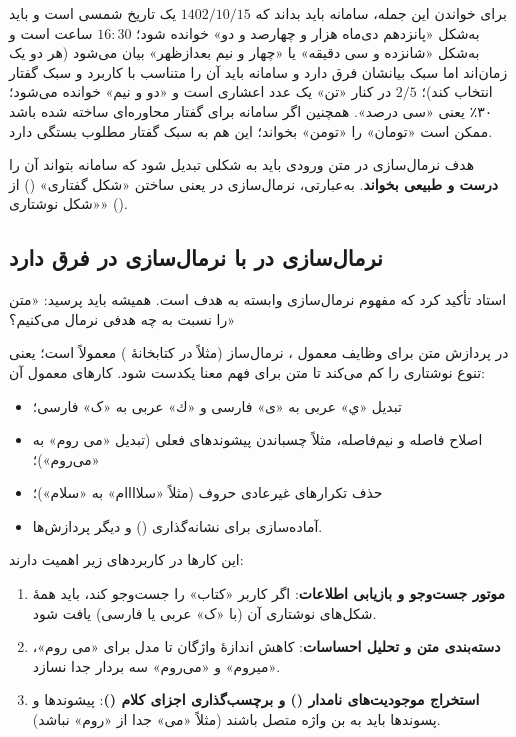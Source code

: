 برای خواندن این جمله، سامانه باید بداند که $1402/10/15$ یک تاریخ شمسی است و باید به‌شکل «پانزدهم دی‌ماه هزار و چهارصد و دو» خوانده شود؛ $16{:}30$ ساعت است و به‌شکل «شانزده و سی دقیقه» یا «چهار و نیم بعدازظهر» بیان می‌شود (هر دو یک زمان‌اند اما سبک بیانشان فرق دارد و سامانه باید آن را متناسب با کاربرد و سبک گفتار انتخاب کند)؛ $2/5$ در کنار «تن» یک عدد اعشاری است و «دو و نیم» خوانده می‌شود؛ ۳۰٪ یعنی «سی درصد». همچنین اگر سامانه برای گفتار محاوره‌ای ساخته شده باشد ممکن است «تومان» را «تومن» بخواند؛ این هم به سبک گفتار مطلوب بستگی دارد.

\begin{definitionbox}{هدف نرمال‌سازی در }
متن ورودی باید به شکلی تبدیل شود که سامانه بتواند آن را \textbf{درست و طبیعی بخواند}. به‌عبارتی، نرمال‌سازی در  یعنی ساختن «شکل گفتاری» () از «شکل نوشتاری» ().
\end{definitionbox}

\subsection{نرمال‌سازی در  با نرمال‌سازی در  فرق دارد}
استاد تأکید کرد که مفهوم نرمال‌سازی وابسته به هدف است. همیشه باید پرسید: «متن را نسبت به چه هدفی نرمال می‌کنیم؟»

در پردازش متن برای وظایف معمول ، نرمال‌ساز (مثلاً در کتابخانهٔ ) معمولاً  است؛ یعنی تنوع نوشتاری را کم می‌کند تا متن برای فهم معنا یکدست شود. کارهای معمول آن:
\begin{itemize}
  \item تبدیل «ي» عربی به «ی» فارسی و «ك» عربی به «ک» فارسی؛
  \item اصلاح فاصله و نیم‌فاصله، مثلاً چسباندن پیشوندهای فعلی (تبدیل «می روم» به «می‌روم»)؛
  \item حذف تکرارهای غیرعادی حروف (مثلاً «سلاااام» به «سلام»)؛
  \item آماده‌سازی برای نشانه‌گذاری () و دیگر پردازش‌ها.
\end{itemize}
این کارها در کاربردهای زیر اهمیت دارند:
\begin{enumerate}
  \item \textbf{موتور جست‌وجو و بازیابی اطلاعات}: اگر کاربر «کتاب» را جست‌وجو کند، باید همهٔ شکل‌های نوشتاری آن (با «ک» عربی یا فارسی) یافت شود.
  \item \textbf{دسته‌بندی متن و تحلیل احساسات}: کاهش اندازهٔ واژگان تا مدل برای «می روم»، «میروم» و «می‌روم» سه بردار جدا نسازد.
  \item \textbf{استخراج موجودیت‌های نامدار () و برچسب‌گذاری اجزای کلام ()}: پیشوندها و پسوندها باید به بن واژه متصل باشند (مثلاً «می» جدا از «روم» نباشد).
\end{enumerate}

